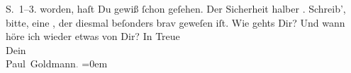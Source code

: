 \begin{ledgroupsized}[t]{13cm}
{{{                     S. 1–3.}}}\label{K_L02624-1h} worden, haſt Du gewiß ſchon geſehen. Der Sicherheit
               halber \label{K_L02624-2v}\label{K_L02624-2h}. Schreib’, bitte, eine \label{K_L02624-3v}\label{K_L02624-3h}, der diesmal beſonders brav geweſen iſt.\pend
           \pstart
           Wie gehts Dir? Und wann höre ich wieder etwas von Dir?\pend
           \pstart
           In Treue{\\[\baselineskip]}Dein{\\[\baselineskip]}\spacefill\mbox{Paul Goldmann\textcolor{gray}{.}}\pend
           \leftskip=0em{}
         
         \endnumbering{}\end{ledgroupsized}  \newcommand{\dateiname}{L02624}\newcommand{\titel}{Paul Goldmann an Arthur Schnitzler, 4. 12. 1894}\newcommand{\editorInnen}{Martin Anton Müller und Laura Untner}
      